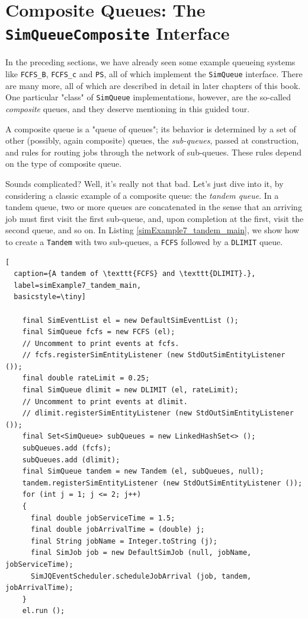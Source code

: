 \documentclass[12pt]{book}
\begin{document}
\section{Composite Queues: The \texttt{SimQueueComposite} Interface}
\label{sec:guided:simqueue-composite}

In the preceding sections,
  we have already seen some example queueing systems
  like \lstinline|FCFS_B|, \lstinline|FCFS_c|
  and \lstinline|PS|,
  all of which implement the \lstinline|SimQueue|
  interface.
There are many more, all of which are described in detail
  in later chapters of this book.
One particular "class" of \lstinline|SimQueue| implementations,
  however, are the so-called {\em composite\/} queues,
  and they deserve mentioning in this guided tour.

A composite queue is a "queue of queues";
  its behavior is determined by a set of other
  (possibly, again composite) queues,
  the {\em sub-queues\/},
  passed at construction,
  and rules for routing jobs through the network
  of sub-queues.
These rules depend on the type of composite queue.

Sounds complicated?
Well, it's really not that bad.
Let's just dive into it,
  by considering a classic example of a composite queue:
  the {\em tandem queue}.
In a tandem queue,
  two or more queues
  are concatenated in the
  sense that an arriving job
  must first visit the first sub-queue,
  and, upon completion at the first,
  visit the second queue, and so on.
In Listing \ref{simExample7_tandem_main},
  we show how to create a \lstinline|Tandem|
  with two sub-queues,
  a \lstinline|FCFS|
  followed by a \lstinline|DLIMIT| queue.

\begin{lstfloat}
\begin{lstlisting}[
  caption={A tandem of \texttt{FCFS} and \texttt{DLIMIT}.},
  label=simExample7_tandem_main,
  basicstyle=\tiny]

    final SimEventList el = new DefaultSimEventList ();
    final SimQueue fcfs = new FCFS (el);
    // Uncomment to print events at fcfs.
    // fcfs.registerSimEntityListener (new StdOutSimEntityListener ());
    final double rateLimit = 0.25;
    final SimQueue dlimit = new DLIMIT (el, rateLimit);
    // Uncomment to print events at dlimit.
    // dlimit.registerSimEntityListener (new StdOutSimEntityListener ());
    final Set<SimQueue> subQueues = new LinkedHashSet<> ();
    subQueues.add (fcfs);
    subQueues.add (dlimit);
    final SimQueue tandem = new Tandem (el, subQueues, null);
    tandem.registerSimEntityListener (new StdOutSimEntityListener ());
    for (int j = 1; j <= 2; j++)
    {
      final double jobServiceTime = 1.5;
      final double jobArrivalTime = (double) j;
      final String jobName = Integer.toString (j);
      final SimJob job = new DefaultSimJob (null, jobName, jobServiceTime);
      SimJQEventScheduler.scheduleJobArrival (job, tandem, jobArrivalTime);
    }
    el.run ();

\end{lstlisting}
\end{lstfloat}
\end{document}
